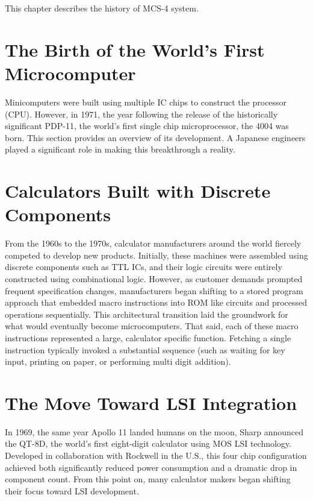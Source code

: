 This chapter describes the history of MCS-4 system.
\section{The Birth of the World's First Microcomputer}
Minicomputers were built using multiple IC chips to construct the processor (CPU). However, in 1971, the year following the release of the historically significant PDP-11, the world’s first single chip microprocessor, the 4004 was born. This section provides an overview of its development. A Japanese engineers played a significant role in making this breakthrough a reality.\cite{4004_Shima}

\section{Calculators Built with Discrete Components}
From the 1960s to the 1970s, calculator manufacturers around the world fiercely competed to develop new products. Initially, these machines were assembled using discrete components such as TTL ICs, and their logic circuits were entirely constructed using combinational logic. However, as customer demands prompted frequent specification changes, manufacturers began shifting to a stored program approach that embedded macro instructions into ROM like circuits and processed operations sequentially. This architectural transition laid the groundwork for what would eventually become microcomputers. That said, each of these macro instructions represented a large, calculator specific function. Fetching a single instruction typically invoked a substantial sequence (such as waiting for key input, printing on paper, or performing multi digit addition).

\section{The Move Toward LSI Integration}
In 1969, the same year Apollo 11 landed humans on the moon, Sharp announced the QT-8D, the world’s first eight-digit calculator using MOS LSI technology. Developed in collaboration with Rockwell in the U.S., this four chip configuration achieved both significantly reduced power consumption and a dramatic drop in component count. From this point on, many calculator makers began shifting their focus toward LSI development.

